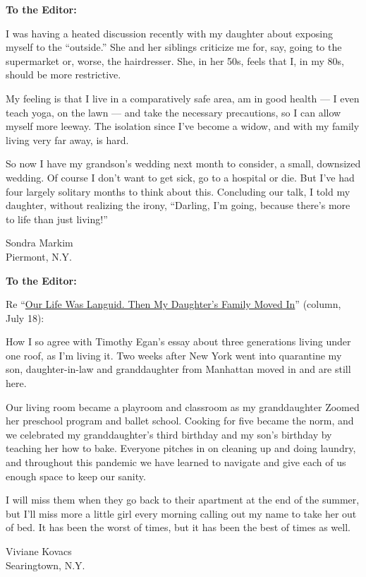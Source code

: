 \textbf{To the Editor:}

I was having a heated discussion recently with my daughter about
exposing myself to the ``outside.'' She and her siblings criticize me
for, say, going to the supermarket or, worse, the hairdresser. She, in
her 50s, feels that I, in my 80s, should be more restrictive.

My feeling is that I live in a comparatively safe area, am in good
health --- I even teach yoga, on the lawn --- and take the necessary
precautions, so I can allow myself more leeway. The isolation since I've
become a widow, and with my family living very far away, is hard.

So now I have my grandson's wedding next month to consider, a small,
downsized wedding. Of course I don't want to get sick, go to a hospital
or die. But I've had four largely solitary months to think about this.
Concluding our talk, I told my daughter, without realizing the irony,
``Darling, I'm going, because there's more to life than just living!''

Sondra Markim\\
Piermont, N.Y.

\textbf{To the Editor:}

Re
``\href{https://www.nytimes3xbfgragh.onion/2020/07/17/opinion/coronavirus-family.html}{Our
Life Was Languid. Then My Daughter's Family Moved In}'' (column, July
18):

How I so agree with Timothy Egan's essay about three generations living
under one roof, as I'm living it. Two weeks after New York went into
quarantine my son, daughter-in-law and granddaughter from Manhattan
moved in and are still here.

Our living room became a playroom and classroom as my granddaughter
Zoomed her preschool program and ballet school. Cooking for five became
the norm, and we celebrated my granddaughter's third birthday and my
son's birthday by teaching her how to bake. Everyone pitches in on
cleaning up and doing laundry, and throughout this pandemic we have
learned to navigate and give each of us enough space to keep our sanity.

I will miss them when they go back to their apartment at the end of the
summer, but I'll miss more a little girl every morning calling out my
name to take her out of bed. It has been the worst of times, but it has
been the best of times as well.

Viviane Kovacs\\
Searingtown, N.Y.

